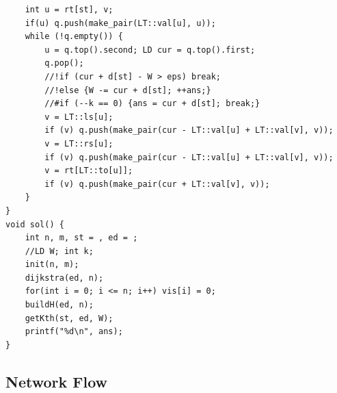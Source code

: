 \documentclass[10pt]{ctexart}
\begin{document}
{\begin{lstlisting}
	int u = rt[st], v;
	if(u) q.push(make_pair(LT::val[u], u));
	while (!q.empty()) {
		u = q.top().second; LD cur = q.top().first;
		q.pop();
		//!if (cur + d[st] - W > eps) break;
		//!else {W -= cur + d[st]; ++ans;}
		//#if (--k == 0) {ans = cur + d[st]; break;}
		v = LT::ls[u];
		if (v) q.push(make_pair(cur - LT::val[u] + LT::val[v], v));
		v = LT::rs[u];
		if (v) q.push(make_pair(cur - LT::val[u] + LT::val[v], v));
		v = rt[LT::to[u]];
		if (v) q.push(make_pair(cur + LT::val[v], v));
	}
}
void sol() {
	int n, m, st = , ed = ;
	//LD W; int k;
	init(n, m);
	dijkstra(ed, n);
	for(int i = 0; i <= n; i++) vis[i] = 0;
	buildH(ed, n);
	getKth(st, ed, W);
	printf("%d\n", ans);
}
\end{lstlisting}
\subsection{Network Flow}
}
\end{document}
